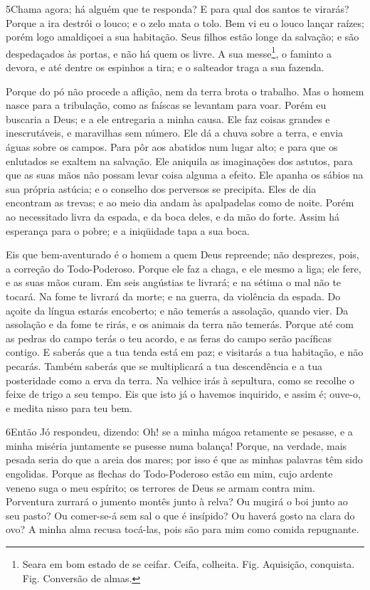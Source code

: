 \medskip

\lettrine{5} Chama agora; há alguém que te responda? E para
qual dos santos te virarás? Porque a ira destrói o louco; e o
zelo mata o tolo. Bem vi eu o louco lançar raízes; porém logo
amaldiçoei a sua habitação. Seus filhos estão longe da salvação;
e são despedaçados às portas, e não há quem os livre. A sua
messe\footnote{Seara em bom estado de se ceifar. Ceifa, colheita.
Fig. Aquisição, conquista. Fig. Conversão de almas.}, o faminto a
devora, e até dentre os espinhos a tira; e o salteador traga a sua
fazenda.

Porque do pó não procede a aflição, nem da terra brota o trabalho.
Mas o homem nasce para a tribulação, como as faíscas se levantam
para voar. Porém eu buscaria a Deus; e a ele entregaria a minha
causa. Ele faz coisas grandes e inescrutáveis, e maravilhas sem
número. Ele dá a chuva sobre a terra, e envia águas sobre os
campos. Para pôr aos abatidos num lugar alto; e para que os
enlutados se exaltem na salvação. Ele aniquila as imaginações
dos astutos, para que as suas mãos não possam levar coisa alguma a
efeito. Ele apanha os sábios na sua própria astúcia; e o
conselho dos perversos se precipita. Eles de dia encontram as
trevas; e ao meio dia andam às apalpadelas como de noite.
Porém ao necessitado livra da espada, e da boca deles, e da
mão do forte. Assim há esperança para o pobre; e a iniqüidade
tapa a sua boca.

Eis que bem-aventurado é o homem a quem Deus repreende; não
desprezes, pois, a correção do Todo-Poderoso. Porque ele faz
a chaga, e ele mesmo a liga; ele fere, e as suas mãos curam.
Em seis angústias te livrará; e na sétima o mal não te
tocará. Na fome te livrará da morte; e na guerra, da
violência da espada. Do açoite da língua estarás encoberto; e
não temerás a assolação, quando vier. Da assolação e da fome
te rirás, e os animais da terra não temerás. Porque até com
as pedras do campo terás o teu acordo, e as feras do campo serão
pacíficas contigo. E saberás que a tua tenda está em paz; e
visitarás a tua habitação, e não pecarás. Também saberás que
se multiplicará a tua descendência e a tua posteridade como a erva
da terra. Na velhice irás à sepultura, como se recolhe o
feixe de trigo a seu tempo. Eis que isto já o havemos
inquirido, e assim é; ouve-o, e medita nisso para teu bem.

\medskip

\lettrine{6} Então Jó respondeu, dizendo: Oh! se a minha
mágoa retamente se pesasse, e a minha miséria juntamente se pusesse
numa balança! Porque, na verdade, mais pesada seria do que a
areia dos mares; por isso é que as minhas palavras têm sido
engolidas. Porque as flechas do Todo-Poderoso estão em mim, cujo
ardente veneno suga o meu espírito; os terrores de Deus se armam
contra mim. Porventura zurrará o jumento montês junto à relva?
Ou mugirá o boi junto ao seu pasto? Ou comer-se-á sem sal o que
é insípido? Ou haverá gosto na clara do ovo? A minha alma recusa
tocá-las, pois são para mim como comida repugnante.

